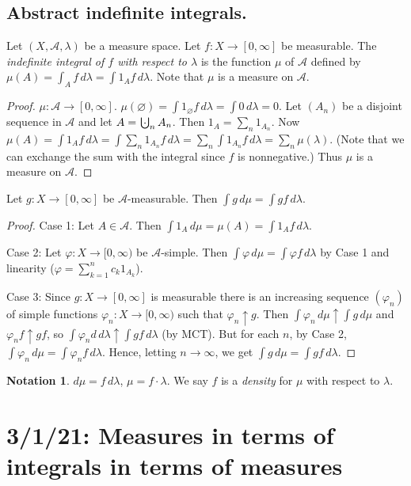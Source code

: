 \documentclass{article}
\newcommand{\bigcupdot}{\mathop{\mathchoice{\hspace{0.45em}}{\hspace{0.35em}}{}{}\cdot\mathchoice{\hspace{-0.85em}}{\hspace{-0.725em}}{}{}\bigcup\limits}}
\theoremstyle{definition}
\newtheorem*{notation}{Notation}
\begin{document}
\subsection*{Abstract indefinite integrals.}
Let $(X, \mathscr{A}, \lambda)$ be a measure space. Let $f : X \longrightarrow [0, \infty]$ be measurable. The \emph{indefinite integral of $f$ with respect to $\lambda$} is the function $\mu$ of $\mathscr{A}$ defined by $\mu(A) = \int_A f\,d\lambda = \int 1_A f\,d\lambda$.
Note that $\mu$ is a measure on $\mathscr{A}$.
\begin{proof}
    $\mu : \mathscr{A} \longrightarrow [0, \infty]$. $\mu(\varnothing) = \int 1_\varnothing f\,d\lambda = \int 0\,d\lambda = 0$.
    Let $(A_n)$ be a disjoint sequence in $\mathscr{A}$ and let $A = \bigcupdot_n A_n$. Then $1_A = \sum_n 1_{A_n}$. Now $\mu(A) = \int 1_A f\,d\lambda = \int \sum_n 1_{A_n} f\,d\lambda = \sum_n \int 1_{A_n} f \,d\lambda = \sum_n \mu(\lambda)$. (Note that we can exchange the sum with the integral since $f$ is nonnegative.) Thus $\mu$ is a measure on $\mathscr{A}$.
\end{proof}
Let $g : X \longrightarrow [0, \infty]$ be $\mathscr{A}$-measurable. Then $\int g\,d\mu = \int gf\,d\lambda$.
\begin{proof}
    Case 1: Let $A \in \mathscr{A}$. Then $\int 1_A\,d\mu = \mu(A) = \int 1_A f\,d\lambda$.
    
    Case 2: Let $\varphi : X \longrightarrow [0, \infty)$ be $\mathscr{A}$-simple. Then $\int \varphi\,d\mu = \int \varphi f \,d\lambda$ by Case 1 and linearity ($\varphi = \sum_{k=1}^n c_k 1_{A_k}$).
    
    Case 3: Since $g : X \longrightarrow [0, \infty]$ is measurable there is an increasing sequence $(\varphi_n)$ of simple functions $\varphi_n : X \longrightarrow [0, \infty)$ such that $\varphi_n \uparrow g$. Then $\int \varphi_n \,d\mu \uparrow \int g\,d\mu$ and $\varphi_n f \uparrow gf$, so $\int \varphi_n d\,d\lambda \uparrow \int gf\,d\lambda$ (by MCT).
    But for each $n$, by Case 2, $\int \varphi_n \,d\mu = \int \varphi_n f\,d\lambda$. Hence, letting $n \to \infty$, we get $\int g\,d\mu = \int gf\,d\lambda$.
\end{proof}

\begin{notation}
$d\mu = f\,d\lambda$, $\mu = f \cdot \lambda$. We say $f$ is a \emph{density} for $\mu$ with respect to $\lambda$.
\end{notation}

\section*{3/1/21: Measures in terms of integrals in terms of measures}
\end{document}
